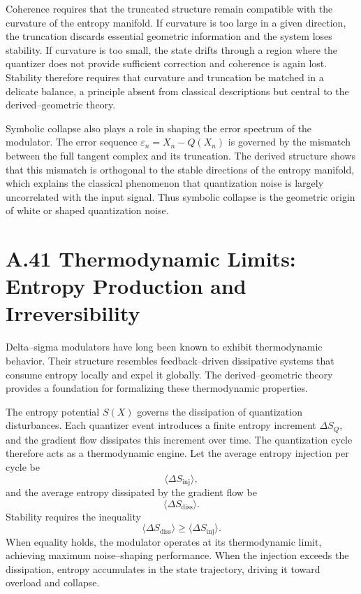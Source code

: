 Coherence requires that the truncated structure remain compatible with the curvature of the entropy manifold. If curvature is too large in a given direction, the truncation discards essential geometric information and the system loses stability. If curvature is too small, the state drifts through a region where the quantizer does not provide sufficient correction and coherence is again lost. Stability therefore requires that curvature and truncation be matched in a delicate balance, a principle absent from classical descriptions but central to the derived–geometric theory.

Symbolic collapse also plays a role in shaping the error spectrum of the modulator. The error sequence \(\varepsilon_n = X_n - Q(X_n)\) is governed by the mismatch between the full tangent complex and its truncation. The derived structure shows that this mismatch is orthogonal to the stable directions of the entropy manifold, which explains the classical phenomenon that quantization noise is largely uncorrelated with the input signal. Thus symbolic collapse is the geometric origin of white or shaped quantization noise.

\section{A.41 Thermodynamic Limits: Entropy Production and Irreversibility}

Delta–sigma modulators have long been known to exhibit thermodynamic behavior. Their structure resembles feedback–driven dissipative systems that consume entropy locally and expel it globally. The derived–geometric theory provides a foundation for formalizing these thermodynamic properties.

The entropy potential \(S(X)\) governs the dissipation of quantization disturbances. Each quantizer event introduces a finite entropy increment \(\Delta S_Q\), and the gradient flow dissipates this increment over time. The quantization cycle therefore acts as a thermodynamic engine. Let the average entropy injection per cycle be
\[
\langle \Delta S_{\mathrm{inj}} \rangle,
\]
and the average entropy dissipated by the gradient flow be
\[
\langle \Delta S_{\mathrm{diss}} \rangle.
\]
Stability requires the inequality
\[
\langle \Delta S_{\mathrm{diss}} \rangle \ge \langle \Delta S_{\mathrm{inj}} \rangle.
\]
When equality holds, the modulator operates at its thermodynamic limit, achieving maximum noise–shaping performance. When the injection exceeds the dissipation, entropy accumulates in the state trajectory, driving it toward overload and collapse.

